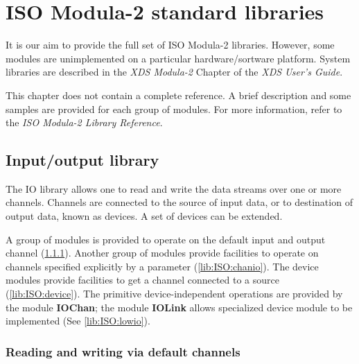 \chapter{ISO Modula-2 standard libraries}\label{lib:ISO}

It is our aim to provide the full set of ISO Modula-2 libraries.
However, some modules are unimplemented on a particular
hardware/sortware platform. %
System libraries are described in the {\em XDS Modula-2} Chapter of the
{\em XDS User's Guide}.

This chapter does not contain a complete reference. A brief
description and some samples are provided for each group of
modules. For more information, refer to the {\em ISO Modula-2
Library Reference}.

\section{Input/output library}\label{lib:ISO:IO}

The IO library allows one to read and write the data streams
over one or more channels. Channels are connected to the source
of input data, or to destination of output data, known as
devices. A set of devices can be extended.

A group of modules is provided to operate on the default input and
output channel (\ref{lib:ISO:stdio}). Another group of modules provide
facilities to operate on channels specified explicitly by a parameter
(\ref{lib:ISO:chanio}). The device modules provide facilities to get a
channel connected to a source (\ref{lib:ISO:device}). The primitive
device-independent operations are provided by the module {\bf IOChan};
the module {\bf IOLink} allows specialized device module
to be implemented (See \ref{lib:ISO:lowio}).

\subsection{Reading and writing via default channels}
\label{lib:ISO:stdio}

